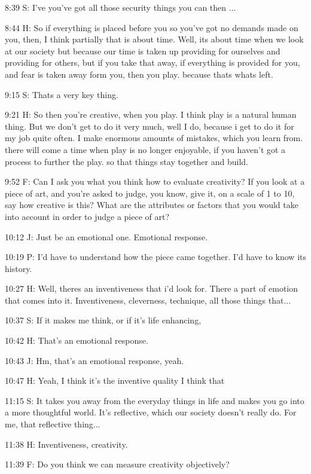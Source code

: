 8:39 S: I've you've got all those security things you can then ...

8:44 H: So if everything is placed before you so you've got no demands made on you, then, I think partially that is about time. Well, its about time when we look at our society but because our time is taken up providing for ourselves and providing for others, but if you take that away, if everything is provided for you, and fear is taken away form you, then you play. because thats whats left.

9:15 S: Thats a very key thing.

9:21 H: So then you're creative, when you play. I think play is a natural human thing. But we don't get to do it very much, well I do, because i get to do it for my job quite often. I make enormous amounts of mistakes, which you learn from. there will come a time when play is no longer enjoyable, if you haven't got a process to further the play. so that things stay together and build.

9:52 F: Can I ask you what you think how to evaluate creativity? If you look at a piece of art, and you're asked to judge, you know, give it, on a scale of 1 to 10, say how creative is this? What are the attributes or factors that you would take into account in order to judge a piece of art?

10:12 J: Just be an emotional one. Emotional response.

10:19 P: I'd have to understand how the piece came together. I'd have to know its history.

10:27 H: Well, theres an inventiveness that i'd look for. There a part of emotion that comes into it. Inventiveness, cleverness, technique, all those things that...

10:37 S: If it makes me think, or if it's life enhancing,

10:42 H: That's an emotional response.

10:43 J: Hm, that's an emotional response, yeah.

10:47 H: Yeah, I think it's the inventive quality I think that

11:15 S: It takes you away from the everyday things in life and makes you go into a more thoughtful world. It's reflective, which our society doesn't really do. For me, that reflective thing...

11:38 H: Inventiveness, creativity.

11:39 F: Do you think we can measure creativity objectively?

